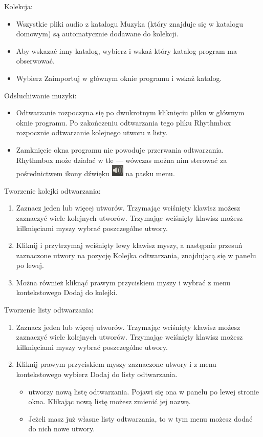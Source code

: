 Kolekcja:
\begin{itemize}
\item Wszystkie pliki audio z katalogu Muzyka (który znajduje się w katalogu domowym) są automatycznie dodawane do kolekcji.
\item Aby wskazać inny katalog, wybierz  i wskaż który katalog program ma obserwować.
\item Wybierz \textcolor{ubuntu_orange}{Zaimportuj} w głównym oknie programu i wskaż katalog.
\end{itemize}
Odsłuchiwanie muzyki:
\begin{itemize}
\item Odtwarzanie rozpoczyna się po dwukrotnym kliknięciu pliku w głównym oknie programu. Po zakończeniu odtwarzania tego pliku Rhythmbox rozpocznie odtwarzanie kolejnego utworu z listy.
\item Zamknięcie okna programu nie powoduje przerwania odtwarzania. Rhythmbox może działać w tle --- wówczas można nim sterować za pośrednictwem ikony dźwięku \includegraphics{images/ikony_dzwiek.png} na pasku menu.
\end{itemize}
Tworzenie kolejki odtwarzania:
\begin{enumerate}
\item Zaznacz jeden lub więcej utworów. Trzymając wciśnięty klawisz  możesz zaznaczyć wiele kolejnych utworów. Trzymając wciśnięty klawisz  możesz kilknięciami myszy wybrać poszczególne utwory.
\item Kliknij i przytrzymaj wciśnięty lewy klawisz myszy, a następnie przesuń zaznaczone utwory na pozycję \textcolor{ubuntu_orange}{Kolejka odtwarzania}, znajdującą się w panelu po lewej.
\item Można również kliknąć prawym przyciskiem myszy i wybrać z menu kontekstowego \textcolor{ubuntu_orange}{Dodaj do kolejki}.
\end{enumerate}
Tworzenie listy odtwarzania:
\begin{enumerate}
\item Zaznacz jeden lub więcej utworów. Trzymając wciśnięty klawisz  możesz zaznaczyć wiele kolejnych utworów. Trzymając wciśnięty klawisz  możesz kilknięciami myszy wybrać poszczególne utwory.
\item  Kliknij prawym przyciskiem myszy zaznaczone utwory i z menu kontekstowego wybierz \textcolor{ubuntu_orange}{Dodaj do listy odtwarzania}.
\begin{itemize}
\item {} utworzy nową listę odtwarzania. Pojawi się ona w panelu po lewej stronie okna. Klikając nową listę możesz zmienić jej nazwę.
\item Jeżeli masz już własne listy odtwarzania, to w tym menu możesz dodać do nich nowe utwory.
\end{itemize}
\end{enumerate}

